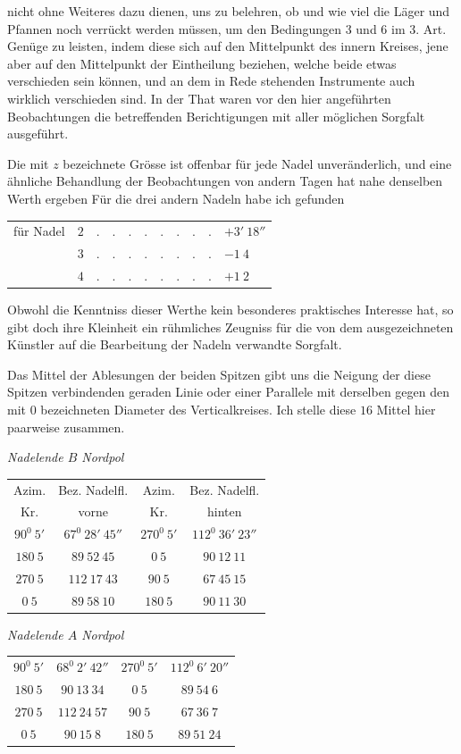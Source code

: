 nicht ohne Weiteres dazu dienen, uns zu belehren, ob und wie viel die Läger und Pfannen noch verrückt werden müssen, um den Bedingungen 3 und 6 im 3. Art. Genüge zu leisten, indem diese sich auf den Mittelpunkt des innern Kreises, jene aber auf den Mittelpunkt der Eintheilung beziehen, welche beide etwas verschieden sein können, und an dem in Rede stehenden Instrumente auch wirklich verschieden sind. In der That waren vor den hier angeführten Beobachtungen die betreffenden Berichtigungen mit aller möglichen Sorgfalt ausgeführt.

Die mit $z$ bezeichnete Grösse ist offenbar für jede Nadel unveränderlich, und eine ähnliche Behandlung der Beobachtungen von andern Tagen hat nahe denselben Werth ergeben Für die drei andern Nadeln habe ich gefunden
\begin{center}
\begin{tabular}{crll}
für Nadel&$2$&$.\quad.\quad.\quad.\quad.\quad.\quad.\quad.$&$+3'\ 18''$\\
&$3$&$.\quad.\quad.\quad.\quad.\quad.\quad.\quad.$&$-1\ 4$\\
&$4$&$.\quad.\quad.\quad.\quad.\quad.\quad.\quad.$&$+1\ 2$
\end{tabular}
\end{center}

Obwohl die Kenntniss dieser Werthe kein besonderes praktisches Interesse hat, so gibt doch ihre Kleinheit ein rühmliches Zeugniss für die von dem ausgezeichneten Künstler auf die Bearbeitung der Nadeln verwandte Sorgfalt.

Das Mittel der Ablesungen der beiden Spitzen gibt uns die Neigung der diese Spitzen verbindenden geraden Linie oder einer Parallele mit derselben gegen den mit $0$ bezeichneten Diameter des Verticalkreises. Ich stelle diese $16$ Mittel hier paarweise zusammen.
\begin{center}
\textit{Nadelende $B$ Nordpol}\par\smallskip
{\fontsize{9}{11}\selectfont
\begin{tabular}{c|c||c|c}
Azim.&Bez. Nadelfl.&Azim.&Bez. Nadelfl.\\
Kr.&vorne&Kr.&hinten\\\hline
$90^0\ 5'$&$67^0\ 28'\ 45''$&$270^0\ 5'$&$112^0\ 36'\ 23''$\\
$180\ 5$&$89\ 52\ 45$&$0\ 5$&$90\ 12\ 11$\\
$270\ 5$&$112\ 17\ 43$&$90\ 5$&$67\ 45\ 15$\\
$0\ 5$&$89\ 58\ 10$&$180\ 5$&$90\ 11\ 30$
\end{tabular}}
\par\medskip
\textit{Nadelende $A$ Nordpol}\par\smallskip
{\fontsize{9}{11}\selectfont
\begin{tabular}{c|c||c|c}
$90^0\ 5'$&$68^0\ 2'\ 42''$&$270^0\ 5'$&$112^0\ 6'\ 20''$\\
$180\ 5$&$90\ 13\ 34$&$0\ 5$&$89\ 54\ 6$\\
$270\ 5$&$112\ 24\ 57$&$90\ 5$&$67\ 36\ 7$\\
$0\ 5$&$90\ 15\ 8$&$180\ 5$&$89\ 51\ 24$
\end{tabular}}
\end{center}

